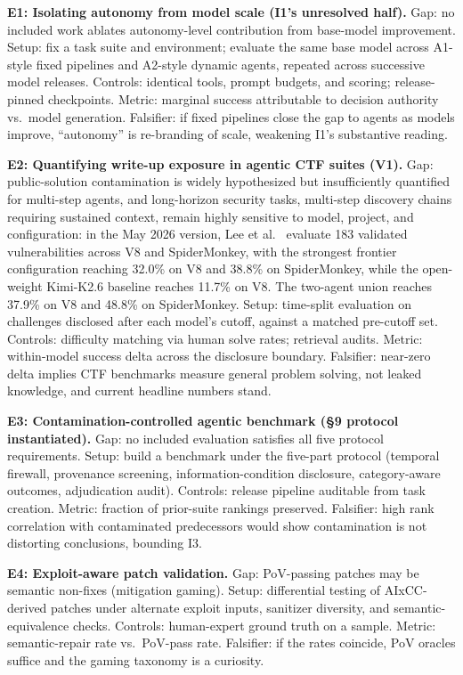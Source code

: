 \documentclass[conference,compsoc]{IEEEtran}
\begin{document}
\textbf{E1: Isolating autonomy from model scale (I1's unresolved half).}
Gap: no included work ablates autonomy-level contribution from base-model improvement.
Setup: fix a task suite and environment; evaluate the same base model across A1-style fixed
pipelines and A2-style dynamic agents, repeated across successive model releases.
Controls: identical tools, prompt budgets, and scoring; release-pinned checkpoints.
Metric: marginal success attributable to decision authority vs.\ model generation.
Falsifier: if fixed pipelines close the gap to agents as models improve, ``autonomy'' is
re-branding of scale, weakening I1's substantive reading.

\textbf{E2: Quantifying write-up exposure in agentic CTF suites (V1).}
Gap: public-solution contamination is widely hypothesized but insufficiently quantified for multi-step
agents, and long-horizon security tasks, multi-step discovery chains requiring sustained
context, remain highly sensitive to model, project, and configuration: in the May 2026
version, Lee et al.~\cite{secbenchpro2026} evaluate 183 validated vulnerabilities across V8 and
SpiderMonkey, with the strongest frontier configuration reaching 32.0\% on V8 and 38.8\% on
SpiderMonkey, while the open-weight Kimi-K2.6 baseline reaches 11.7\% on V8. The two-agent
union reaches 37.9\% on V8 and 48.8\% on SpiderMonkey.
Setup: time-split evaluation on challenges disclosed after each model's cutoff, against
a matched pre-cutoff set. Controls: difficulty matching via human solve rates; retrieval
audits. Metric: within-model success delta across the disclosure boundary.
Falsifier: near-zero delta implies CTF benchmarks measure general problem solving, not leaked
knowledge, and current headline numbers stand.

\textbf{E3: Contamination-controlled agentic benchmark (§9 protocol instantiated).}
Gap: no included evaluation satisfies all five protocol requirements.
Setup: build a benchmark under the five-part protocol (temporal firewall, provenance
screening, information-condition disclosure, category-aware outcomes, adjudication audit).
Controls: release pipeline auditable from task creation. Metric: fraction of prior-suite
rankings preserved. Falsifier: high rank correlation with contaminated predecessors would show
contamination is not distorting conclusions, bounding I3.

\textbf{E4: Exploit-aware patch validation.}
Gap: PoV-passing patches may be semantic non-fixes (mitigation gaming). Setup: differential
testing of AIxCC-derived patches under alternate exploit inputs, sanitizer diversity, and
semantic-equivalence checks. Controls: human-expert ground truth on a sample. Metric:
semantic-repair rate vs.\ PoV-pass rate. Falsifier: if the rates coincide, PoV oracles suffice
and the gaming taxonomy is a curiosity.
\end{document}
